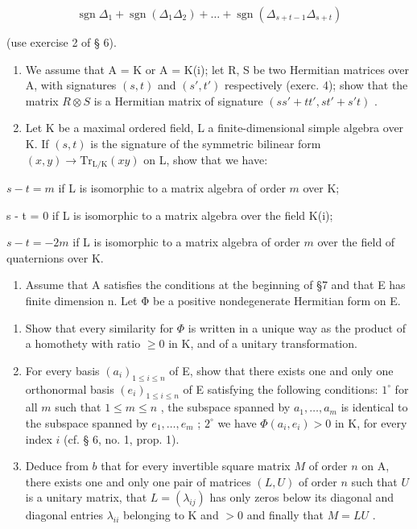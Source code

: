 \[
\operatorname{sgn} \Delta_ {1} + \operatorname{sgn} \left(\Delta_ {1} \Delta_ {2}\right) + \dots + \operatorname{sgn} \left(\Delta_ {s + t - 1} \Delta_ {s + t}\right)
\]

(use exercise 2 of § 6).

\begin{enumerate}
\def\labelenumi{\arabic{enumi})}
\setcounter{enumi}{4}
\item
  We assume that A = K or A = K(i); let R, S be two Hermitian matrices over A, with signatures \((s, t)\) and \((s', t')\) respectively (exerc. 4); show that the matrix \(R \otimes S\) is a Hermitian matrix of signature \((ss' + tt', st' + s't)\) .
\item
  Let K be a maximal ordered field, L a finite-dimensional simple algebra over K. If \((s, t)\) is the signature of the symmetric bilinear form \((x, y) \to \mathrm{Tr}_{\mathrm{L/K}}(xy)\) on L, show that we have:
\end{enumerate}

\(s-t=m\) if L is isomorphic to a matrix algebra of order \(m\) over K;

s - t = 0 if L is isomorphic to a matrix algebra over the field K(i);

\(s - t = -2m\) if L is isomorphic to a matrix algebra of order \(m\) over the field of quaternions over K.

\begin{enumerate}
\def\labelenumi{\arabic{enumi})}
\setcounter{enumi}{6}
\tightlist
\item
  Assume that A satisfies the conditions at the beginning of §7 and that E has finite dimension n. Let Φ be a positive nondegenerate Hermitian form on E.
\end{enumerate}

\begin{enumerate}
\def\labelenumi{\alph{enumi})}
\item
  Show that every similarity for \(\Phi\) is written in a unique way as the product of a homothety with ratio \(\geqslant 0\) in K, and of a unitary transformation.
\item
  For every basis \((a_{i})_{1\leqslant i\leqslant n}\) of E, show that there exists one and only one orthonormal basis \((e_{i})_{1\leqslant i\leqslant n}\) of E satisfying the following conditions: \(1^{\circ}\) for all \(m\) such that \(1\leqslant m\leqslant n\) , the subspace spanned by \(a_1,\ldots ,a_m\) is identical to the subspace spanned by \(e_1,\ldots ,e_m\) ; \(2^{\circ}\) we have \(\Phi (a_i,e_i) > 0\) in K, for every index \(i\) (cf. § 6, no. 1, prop. 1).
\item
  Deduce from \(b\) that for every invertible square matrix \(M\) of order \(n\) on A, there exists one and only one pair of matrices \((L, U)\) of order \(n\) such that \(U\) is a unitary matrix, that \(L = (\lambda_{ij})\) has only zeros below its diagonal and diagonal entries \(\lambda_{ii}\) belonging to K and \(>0\) and finally that \(M = LU\) .
\end{enumerate}

